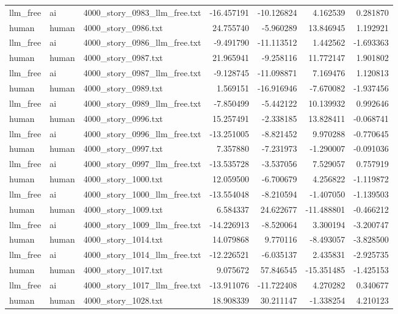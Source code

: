 \begin{longtable}{lllrrrr}
llm\_free & ai & 4000\_story\_0983\_llm\_free.txt & -16.457191 & -10.126824 & 4.162539 & 0.281870 \\
human & human & 4000\_story\_0986.txt & 24.755740 & -5.960289 & 13.846945 & 1.192921 \\
llm\_free & ai & 4000\_story\_0986\_llm\_free.txt & -9.491790 & -11.113512 & 1.442562 & -1.693363 \\
human & human & 4000\_story\_0987.txt & 21.965941 & -9.258116 & 11.772147 & 1.901802 \\
llm\_free & ai & 4000\_story\_0987\_llm\_free.txt & -9.128745 & -11.098871 & 7.169476 & 1.120813 \\
human & human & 4000\_story\_0989.txt & 1.569151 & -16.916946 & -7.670082 & -1.937456 \\
llm\_free & ai & 4000\_story\_0989\_llm\_free.txt & -7.850499 & -5.442122 & 10.139932 & 0.992646 \\
human & human & 4000\_story\_0996.txt & 15.257491 & -2.338185 & 13.828411 & -0.068741 \\
llm\_free & ai & 4000\_story\_0996\_llm\_free.txt & -13.251005 & -8.821452 & 9.970288 & -0.770645 \\
human & human & 4000\_story\_0997.txt & 7.357880 & -7.231973 & -1.290007 & -0.091036 \\
llm\_free & ai & 4000\_story\_0997\_llm\_free.txt & -13.535728 & -3.537056 & 7.529057 & 0.757919 \\
human & human & 4000\_story\_1000.txt & 12.059500 & -6.700679 & 4.256822 & -1.119872 \\
llm\_free & ai & 4000\_story\_1000\_llm\_free.txt & -13.554048 & -8.210594 & -1.407050 & -1.139503 \\
human & human & 4000\_story\_1009.txt & 6.584337 & 24.622677 & -11.488801 & -0.466212 \\
llm\_free & ai & 4000\_story\_1009\_llm\_free.txt & -14.226913 & -8.520064 & 3.300194 & -3.200747 \\
human & human & 4000\_story\_1014.txt & 14.079868 & 9.770116 & -8.493057 & -3.828500 \\
llm\_free & ai & 4000\_story\_1014\_llm\_free.txt & -12.226521 & -6.035137 & 2.435831 & -2.925735 \\
human & human & 4000\_story\_1017.txt & 9.075672 & 57.846545 & -15.351485 & -1.425153 \\
llm\_free & ai & 4000\_story\_1017\_llm\_free.txt & -13.911076 & -11.722408 & 4.270282 & 0.340677 \\
human & human & 4000\_story\_1028.txt & 18.908339 & 30.211147 & -1.338254 & 4.210123 \\

\end{longtable}
